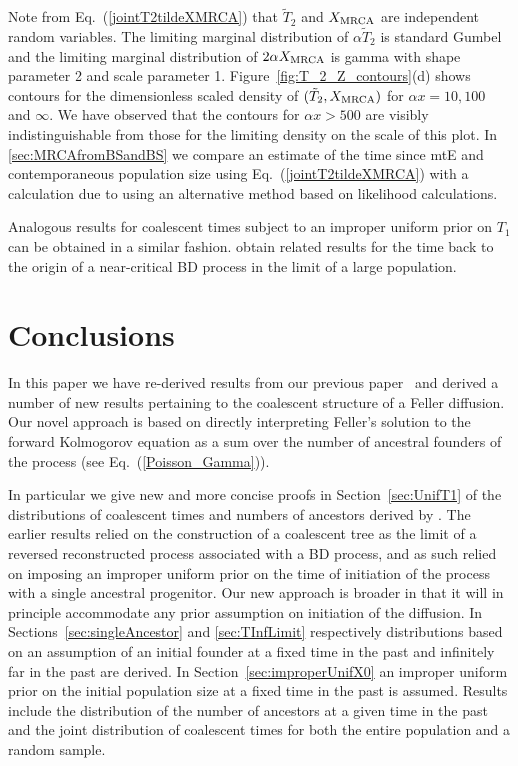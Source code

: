 \documentclass[preprint,12pt]{elsarticle}
\begin{document}
Note from Eq.~(\ref{jointT2tildeXMRCA}) that $\tilde{T}_2$ and $X_{\rm MRCA}$ are independent random variables. The limiting marginal distribution
of $\alpha\tilde{T}_2$ is standard Gumbel and the limiting marginal distribution of $2\alpha X_{\rm MRCA}$ is gamma with shape parameter 2 
and scale parameter 1. Figure~\ref{fig:T_2_Z_contours}(d) shows contours for the dimensionless scaled density of $(\tilde{T}_2, X_{\rm MRCA})$ for 
$\alpha x = 10, 100$ and $\infty$.  We have observed that the contours for $\alpha x > 500$ are visibly indistinguishable from those for the limiting density 
on the scale of this plot.  In \ref{sec:MRCAfromBSandBS} we compare an estimate of the time since mtE and 
contemporaneous population size using Eq.~(\ref{jointT2tildeXMRCA}) with a calculation due to \citet{burden2016genetic} using an alternative method 
based on likelihood calculations.  

Analogous results for coalescent times subject to an improper uniform prior on $T_1$ can be obtained in a similar fashion.  
\citet[Section~4.4]{Ignatieva20} obtain related results for the time back to the origin of a near-critical BD process in the limit of a large population.

%

\section{Conclusions}
\label{sec:Conclusions}

In this paper we have re-derived results from our previous paper~\citep{BurdenGriffiths24} and derived a number of new results pertaining to the coalescent 
structure of a Feller diffusion.  Our novel approach is based on directly interpreting Feller's solution to the forward Kolmogorov 
equation as a sum over the number of ancestral founders of the process (see Eq.~(\ref{Poisson_Gamma})).  

In particular we give new and more concise proofs in Section~\ref{sec:UnifT1} of the distributions of coalescent times and numbers of ancestors derived by 
\citet[theorem~4]{BurdenGriffiths24}.  The earlier results relied on the construction of a coalescent tree as the limit of a reversed reconstructed process 
associated with a BD process, and as such relied on imposing an improper uniform prior on the time of initiation of the process with a single ancestral 
progenitor.  Our new approach is broader in that it will in principle accommodate any prior assumption on initiation of the diffusion.  
In Sections~\ref{sec:singleAncestor} and \ref{sec:TInfLimit} respectively distributions based on an assumption of an initial founder at a fixed time in the past 
and infinitely far in the past are derived.  In Section~\ref{sec:improperUnifX0} an improper uniform prior on the 
initial population size at a fixed time in the past is assumed.  Results include the distribution of the number of ancestors at a given time in the past and 
the joint distribution of coalescent times for both the entire population and a random sample.  
\end{document}
